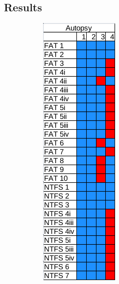\subsection{Results}
\begin{figure}[h!]
    \centering

    \begin{subfigure}{0.3\linewidth}
        \includegraphics[width=\linewidth]{fig/autopsy_results.png}

\end{subfigure}
\end{figure}
